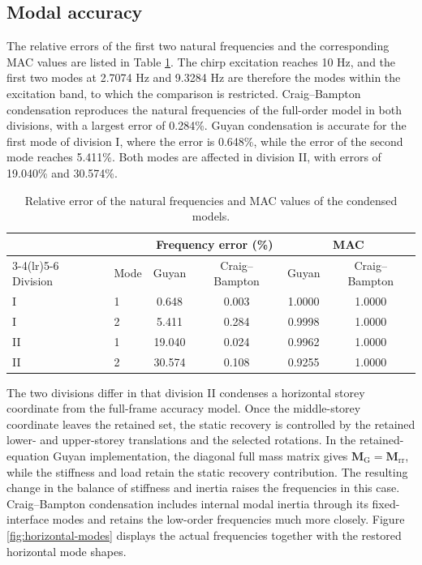 \documentclass[a4paper,fleqn,review,12pt]{cas-sc}
\begin{document}
\subsection{Modal accuracy}
\label{sec:modal-accuracy}

The relative errors of the first two natural frequencies and the corresponding MAC values are listed in Table \ref{tab:modal}. The chirp excitation reaches 10 Hz, and the first two modes at 2.7074 Hz and 9.3284 Hz are therefore the modes within the excitation band, to which the comparison is restricted. Craig--Bampton condensation reproduces the natural frequencies of the full-order model in both divisions, with a largest error of 0.284\%. Guyan condensation is accurate for the first mode of division I, where the error is 0.648\%, while the error of the second mode reaches 5.411\%. Both modes are affected in division II, with errors of 19.040\% and 30.574\%.

\begin{table}[htbp]
	\centering
	\caption{Relative error of the natural frequencies and MAC values of the condensed models.}
	\label{tab:modal}
	\begin{tabular}{llcccc}
		\toprule
		& & \multicolumn{2}{c}{Frequency error (\%)} & \multicolumn{2}{c}{MAC}\\
		\cmidrule(lr){3-4}\cmidrule(lr){5-6}
		Division & Mode & Guyan & Craig--Bampton & Guyan & Craig--Bampton\\
		\midrule
		I  & 1 & 0.648  & 0.003 & 1.0000 & 1.0000\\
		I  & 2 & 5.411  & 0.284 & 0.9998 & 1.0000\\
		\midrule
		II & 1 & 19.040 & 0.024 & 0.9962 & 1.0000\\
		II & 2 & 30.574 & 0.108 & 0.9255 & 1.0000\\
		\bottomrule
	\end{tabular}
\end{table}

The two divisions differ in that division II condenses a horizontal storey coordinate from the full-frame accuracy model. Once the middle-storey coordinate leaves the retained set, the static recovery is controlled by the retained lower- and upper-storey translations and the selected rotations. In the retained-equation Guyan implementation, the diagonal full mass matrix gives \(\mathbf M_{\mathrm G}=\mathbf M_{\mathrm{rr}}\), while the stiffness and load retain the static recovery contribution. The resulting change in the balance of stiffness and inertia raises the frequencies in this case. Craig--Bampton condensation includes internal modal inertia through its fixed-interface modes and retains the low-order frequencies much more closely. Figure \ref{fig:horizontal-modes} displays the actual frequencies together with the restored horizontal mode shapes.
\end{document}
